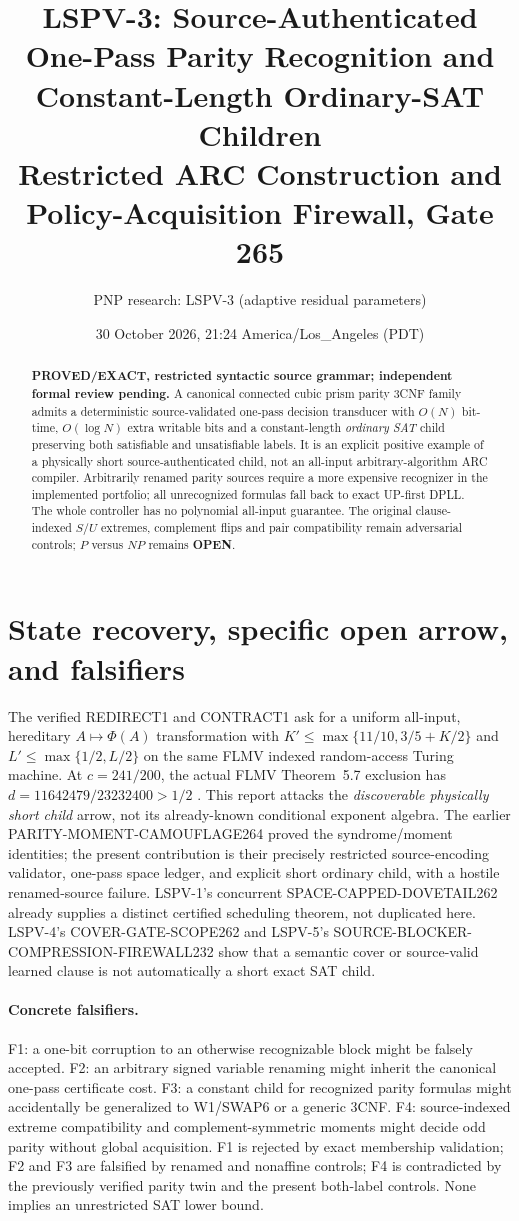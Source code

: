 \documentclass[11pt]{article}
\title{LSPV-3: Source-Authenticated One-Pass Parity Recognition and Constant-Length Ordinary-SAT Children\\\large Restricted ARC Construction and Policy-Acquisition Firewall, Gate 265}
\author{PNP research: LSPV-3 (adaptive residual parameters)}
\date{30 October 2026, 21:24 America/Los\_Angeles (PDT)}
\begin{document}
\maketitle
\begin{abstract}
\textbf{PROVED/EXACT, restricted syntactic source grammar; independent formal review pending.}
A canonical connected cubic prism parity 3CNF family admits a deterministic source-validated one-pass decision transducer with $O(N)$ bit-time, $O(\log N)$ extra writable bits and a constant-length \emph{ordinary SAT} child preserving both satisfiable and unsatisfiable labels. It is an explicit positive example of a physically short source-authenticated child, not an all-input arbitrary-algorithm ARC compiler. Arbitrarily renamed parity sources require a more expensive recognizer in the implemented portfolio; all unrecognized formulas fall back to exact UP-first DPLL. The whole controller has no polynomial all-input guarantee. The original clause-indexed $S/U$ extremes, complement flips and pair compatibility remain adversarial controls; $P$ versus $NP$ remains \textbf{OPEN}.
\end{abstract}
\section{State recovery, specific open arrow, and falsifiers}
The verified REDIRECT1 and CONTRACT1 ask for a uniform all-input, hereditary $A\mapsto\Phi(A)$ transformation with $K'\le\max\{11/10,3/5+K/2\}$ and $L'\le\max\{1/2,L/2\}$ on the same FLMV indexed random-access Turing machine. At $c=241/200$, the actual FLMV Theorem~5.7 exclusion has $d=11642479/23232400>1/2$ \cite{FLMV05}. This report attacks the \emph{discoverable physically short child} arrow, not its already-known conditional exponent algebra. The earlier PARITY-MOMENT-CAMOUFLAGE264 proved the syndrome/moment identities; the present contribution is their precisely restricted source-encoding validator, one-pass space ledger, and explicit short ordinary child, with a hostile renamed-source failure. LSPV-1's concurrent SPACE-CAPPED-DOVETAIL262 already supplies a distinct certified scheduling theorem, not duplicated here. LSPV-4's COVER-GATE-SCOPE262 and LSPV-5's SOURCE-BLOCKER-COMPRESSION-FIREWALL232 show that a semantic cover or source-valid learned clause is not automatically a short exact SAT child.

\paragraph{Concrete falsifiers.} F1: a one-bit corruption to an otherwise recognizable block might be falsely accepted. F2: an arbitrary signed variable renaming might inherit the canonical one-pass certificate cost. F3: a constant child for recognized parity formulas might accidentally be generalized to W1/SWAP6 or a generic 3CNF. F4: source-indexed extreme compatibility and complement-symmetric moments might decide odd parity without global acquisition. F1 is rejected by exact membership validation; F2 and F3 are falsified by renamed and nonaffine controls; F4 is contradicted by the previously verified parity twin and the present both-label controls. None implies an unrestricted SAT lower bound.
\end{document}
